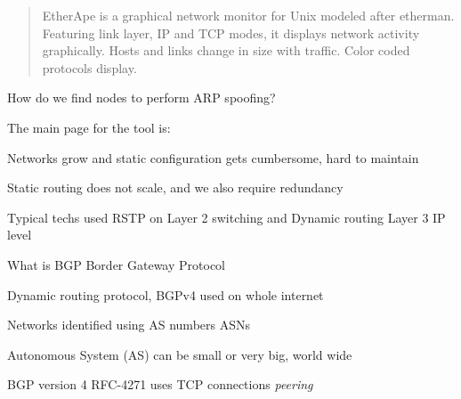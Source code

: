 \documentclass[Screen16to9,17pt]{foils}
\begin{document}


\begin{quote}
EtherApe is a graphical network monitor for Unix modeled after etherman. Featuring link layer, IP and TCP modes, it displays network activity graphically. Hosts and links change in size with traffic. Color coded protocols display.
\end{quote}

\begin{list1}
\item How do we find nodes to perform ARP spoofing?
\item The main page for the tool is:
\end{list1}









\begin{list1}
\item Networks grow and static configuration gets cumbersome, hard to maintain
\item Static routing does not scale, and we also require redundancy
\item Typical techs used RSTP on Layer 2 switching and Dynamic routing Layer 3 IP level
\end{list1}



\begin{list1}
\item What is BGP Border Gateway Protocol
\item Dynamic routing protocol, BGPv4 used on whole internet
\item Networks identified using AS numbers ASNs
\item Autonomous System (AS) can be small or very big, world wide
\item BGP version 4 RFC-4271 uses TCP connections
\emph{peering}
\item {}
\end{list1}


\end{document}
